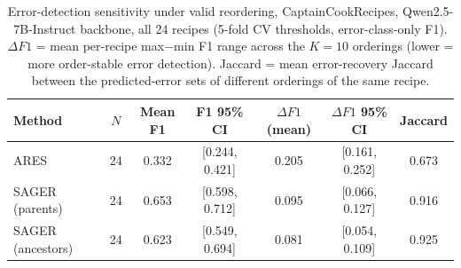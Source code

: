 \begin{table}[h]
\centering
\caption{Error-detection sensitivity under valid reordering, CaptainCookRecipes,
  Qwen2.5-7B-Instruct backbone, all 24 recipes (5-fold CV thresholds,
  error-class-only F1). $\Delta F1$ = mean per-recipe max$-$min F1 range
  across the $K=10$ orderings (lower = more order-stable error detection).
  Jaccard = mean error-recovery Jaccard between the predicted-error sets of
  different orderings of the same recipe.}\label{tab:sager-qwen-f1}
\begin{tabular}{lcccccc}
\toprule
Method & $N$ & Mean F1 & F1 95\% CI & $\Delta F1$ (mean) & $\Delta F1$ 95\% CI & Jaccard \\
\midrule
ARES               & 24 & 0.332 & [0.244, 0.421] & 0.205 & [0.161, 0.252] & 0.673 \\
SAGER (parents)     & 24 & 0.653 & [0.598, 0.712] & 0.095 & [0.066, 0.127] & 0.916 \\
SAGER (ancestors)   & 24 & 0.623 & [0.549, 0.694] & 0.081 & [0.054, 0.109] & 0.925 \\
\bottomrule
\end{tabular}
\end{table}

